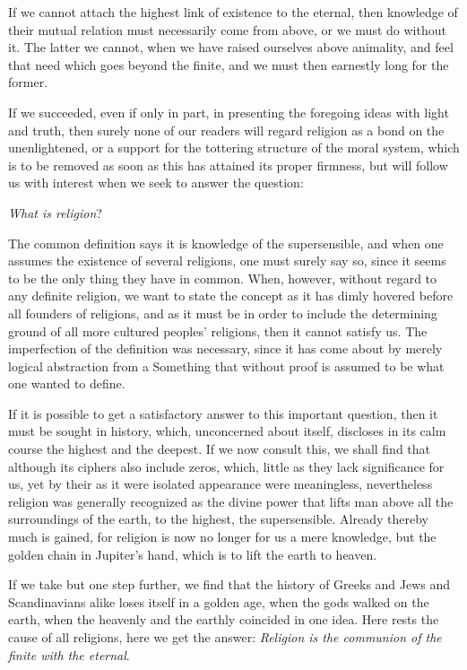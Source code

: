 \documentclass[12pt,a4paper,openany]{book}
\newcommand{\opage}[1]{\marginnote{\footnotesize\textit{[#1]}}}
\begin{document}
If we cannot attach the highest link of existence to the eternal, then knowledge of
their mutual relation must necessarily come from above, or we must do without it.
The latter we cannot, when we have raised ourselves above animality, and feel that
need which goes beyond the finite, and we must then earnestly long for the former.

If we succeeded, even if only in part, in presenting the foregoing ideas with light
and truth, then surely none of our readers will regard religion as a bond on the
unenlightened, or a support for the tottering structure of the moral system, which
is to be removed as soon as this has attained its proper firmness, but will follow
us with interest when we seek to answer the question:

\begin{center}\emph{What is religion}?\end{center}


The common definition says it is knowledge of the supersensible, and when one
assumes the existence of several religions, one must surely say so, since it seems
to be the only thing they have in common. When, however, without regard to any
definite religion, we want to state the concept as it has dimly hovered before all
founders of religions, and as it must be in order to include the determining ground
of all more cultured peoples' religions, then it cannot satisfy us. The imperfection
of the definition was necessary, since it has come about by merely logical
abstraction from a Something that without proof is assumed to be what one wanted to
define.

If it is possible to get a satisfactory answer to this important question, then it
must be sought in history, which, unconcerned about itself, discloses in its calm
course the highest and the deepest. If we now consult this, we shall find that
although its ciphers also include zeros, which, little as they lack significance for
us, yet by their as it were isolated appearance were meaningless, nevertheless
religion was generally recognized as the divine power that lifts man
\setcounter{footnote}{0}%
\opage{59}above all the surroundings of the earth, to the highest, the supersensible.
Already thereby much is gained, for religion is now no longer for us a mere
knowledge, but the golden chain in Jupiter's hand, which is to lift the earth to
heaven.

If we take but one step further, we find that the history of Greeks and Jews and
Scandinavians alike loses itself in a golden age, when the gods walked on the earth,
when the heavenly and the earthly coincided in one idea. Here rests the cause of all
religions, here we get the answer: \emph{Religion is the communion of the finite
with the eternal}.
\end{document}
